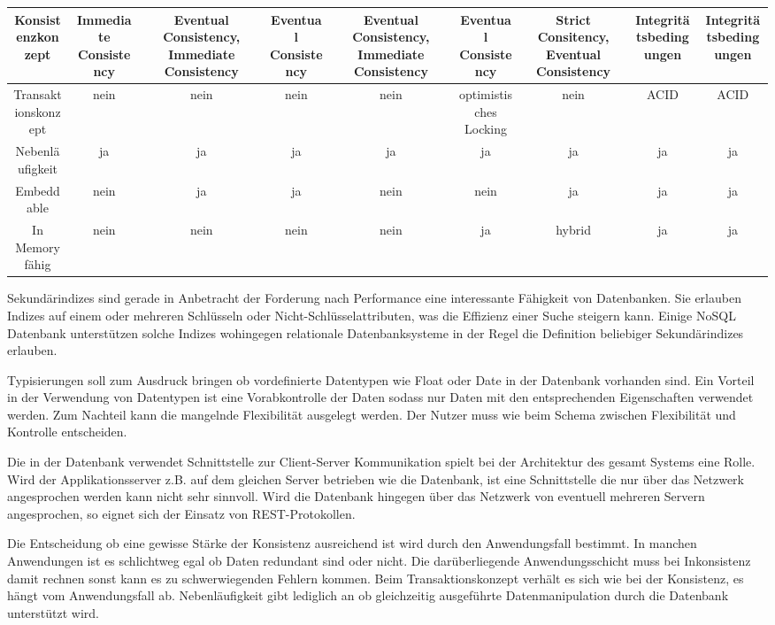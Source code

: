 \begin{table}[H]
\begin{tabulary} {\linewidth} {C | C | C | C | C | C | C | C | C}
\midrule
Konsistenzkonzept & Immediate Consistency & Eventual Consistency, Immediate Consistency & Eventual
Consistency & Eventual Consistency, Immediate Consistency & Eventual Consistency & Strict Consitency, Eventual Consistency &  Integritätsbedingungen & Integritätsbedingungen \\
\midrule
Transaktionskonzept & nein & nein & nein & nein & optimistisches Locking & nein & ACID & ACID \\
\midrule
Nebenläufigkeit & ja & ja & ja & ja & ja & ja & ja & ja \\
\midrule
Embeddable & nein & ja & ja & nein & nein & ja & ja & ja \\
\midrule
In Memory fähig & nein & nein & nein & nein & ja & hybrid & ja & ja \\
\bottomrule
\end{tabulary}
\end{table}

Sekundärindizes sind gerade in Anbetracht der Forderung nach Performance eine interessante Fähigkeit von Datenbanken. Sie erlauben Indizes auf einem oder mehreren Schlüsseln oder Nicht-Schlüsselattributen, was die Effizienz einer Suche steigern kann. Einige NoSQL Datenbank unterstützen solche Indizes wohingegen relationale Datenbanksysteme in der Regel die Definition beliebiger Sekundärindizes erlauben. 

Typisierungen soll zum Ausdruck bringen ob vordefinierte Datentypen wie Float oder Date in der Datenbank vorhanden sind. Ein Vorteil in der Verwendung von Datentypen ist eine Vorabkontrolle der Daten sodass nur Daten mit den entsprechenden Eigenschaften verwendet werden. Zum Nachteil kann die mangelnde Flexibilität ausgelegt werden. Der Nutzer muss wie beim Schema zwischen Flexibilität und Kontrolle entscheiden. 

Die in der Datenbank verwendet Schnittstelle zur Client-Server Kommunikation spielt bei der Architektur des gesamt Systems eine Rolle. Wird der Applikationsserver z.B. auf dem gleichen Server betrieben wie die Datenbank, ist eine Schnittstelle die nur über das Netzwerk angesprochen werden kann nicht sehr sinnvoll. Wird die Datenbank hingegen über das Netzwerk von eventuell mehreren Servern angesprochen, so eignet sich der Einsatz von REST-Protokollen. 

Die Entscheidung ob eine gewisse Stärke der Konsistenz ausreichend ist wird durch den Anwendungsfall bestimmt. In manchen Anwendungen ist es schlichtweg egal ob Daten redundant sind oder nicht. Die darüberliegende Anwendungsschicht muss bei Inkonsistenz damit rechnen sonst kann es zu schwerwiegenden Fehlern kommen. Beim Transaktionskonzept verhält es sich wie bei der Konsistenz, es hängt vom Anwendungsfall ab. Nebenläufigkeit gibt lediglich an ob gleichzeitig ausgeführte Datenmanipulation durch die Datenbank unterstützt wird.   

